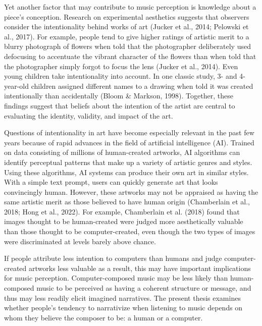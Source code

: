 \documentclass[12pt,twoside]{reedthesis}
\begin{document}
Yet another factor that may contribute to music perception is knowledge about a piece’s conception. Research on experimental aesthetics suggests that observers consider the intentionality behind works of art (Jucker et al., 2014; Pelowski et al., 2017). For example, people tend to give higher ratings of artistic merit to a blurry photograph of flowers when told that the photographer deliberately used defocusing to accentuate the vibrant character of the flowers than when told that the photographer simply forgot to focus the lens (Jucker et al., 2014). Even young children take intentionality into account. In one classic study, 3- and 4-year-old children assigned different names to a drawing when told it was created intentionally than accidentally (Bloom \& Markson, 1998). Together, these findings suggest that beliefs about the intention of the artist are central to evaluating the identity, validity, and impact of the art. 

Questions of intentionality in art have become especially relevant in the past few years because of rapid advances in the field of artificial intelligence (AI). Trained on data consisting of millions of human-created artworks, AI algorithms can identify perceptual patterns that make up a variety of artistic genres and styles. Using these algorithms, AI systems can produce their own art in similar styles. With a simple text prompt, users can quickly generate art that looks convincingly human. However, these artworks may not be appraised as having the same artistic merit as those believed to have human origin (Chamberlain et al., 2018; Hong et al., 2022). For example, Chamberlain et al. (2018) found that images thought to be human-created were judged more aesthetically valuable than those thought to be computer-created, even though the two types of images were discriminated at levels barely above chance. 

If people attribute less intention to computers than humans and judge computer-created artworks less valuable as a result, this may have important implications for music perception. Computer-composed music may be less likely than human-composed music to be perceived as having a coherent structure or message, and thus may less readily elicit imagined narratives. The present thesis examines whether people’s tendency to narrativize when listening to music depends on whom they believe the composer to be: a human or a computer.
\end{document}
